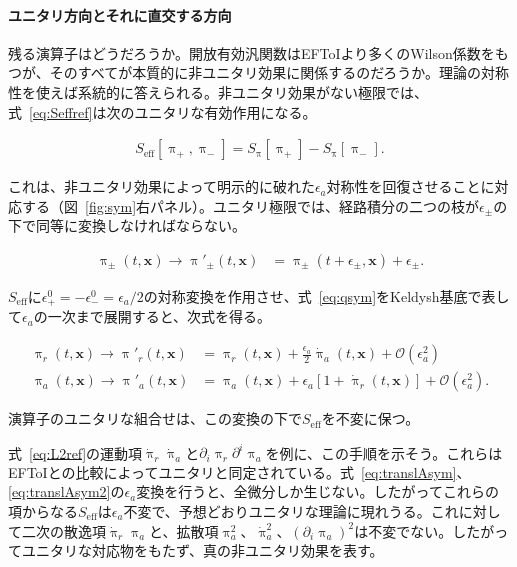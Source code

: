 \documentclass[a4paper,11pt]{ltjsarticle}
\numberwithin{equation}{section}
\newcommand{\boldmathsymbol}[1]{{\ensuremath{\boldsymbol{#1}}}}
\newcommand{\bmx}{\boldmathsymbol{x}}
\newcommand{\Eq}[1]{Eq.~(\ref{#1})}
\newcommand{\Eqs}[1]{Eqs.~(\ref{#1})}
\newcommand{\Fig}[1]{Fig.~{\ref{#1}}}
\def\bmx{{\boldsymbol{x}}}
\renewcommand{\Eq}[1]{式~\eqref{#1}}
\renewcommand{\Eqs}[1]{式~\eqref{#1}}
\renewcommand{\Fig}[1]{図~\ref{#1}}
\begin{document}
\paragraph{ユニタリ方向とそれに直交する方向}

残る演算子はどうだろうか。開放有効汎関数はEFToIより多くのWilson係数をもつが、そのすべてが本質的に非ユニタリ効果に関係するのだろうか。理論の対称性を使えば系統的に答えられる。非ユニタリ効果がない極限では、\Eq{eq:Seffref}は次のユニタリな有効作用になる。

\begin{align}\label{eq:Seffunit}
S_{\mathrm{eff}}\left[ \uppi_+, \uppi_-\right] = S_\uppi\left[\uppi_+\right] - S_\uppi\left[\uppi_-\right].
\end{align}

これは、非ユニタリ効果によって明示的に破れた$\epsilon_a$対称性を回復させることに対応する（\Fig{fig:sym}右パネル）\cite{Hongo:2018ant}。ユニタリ極限では、経路積分の二つの枝が$\epsilon_\pm$の下で同等に変換しなければならない。

\begin{align}\label{eq:qsym}
\uppi_{\pm}(t,\bmx) \rightarrow \uppi'_{\pm}(t,\bmx) &= \uppi_{\pm}(t+\epsilon_{\pm},\bmx) + \epsilon_{\pm}.
\end{align}

$S_{\mathrm{eff}}$に$\epsilon_+^0=-\epsilon_-^0=\epsilon_a/2$の対称変換を作用させ、\Eq{eq:qsym}をKeldysh基底で表して$\epsilon_a$の一次まで展開すると、次式を得る。

\begin{align}
\uppi_{r}(t,\bmx) \rightarrow \uppi'_{r}(t,\bmx) &= \uppi_{r}(t,\bmx) + \frac{\epsilon_a}{2}\dot{\uppi}_{a}(t,\bmx) + \mathcal{O}\left(\epsilon_a^2\right)\label{eq:translAsym} \\
\uppi_{a}(t,\bmx) \rightarrow \uppi'_{a}(t,\bmx) &= \uppi_{a}(t,\bmx) + \epsilon_a\left[1+\dot{\uppi}_{r}(t,\bmx)\right] + \mathcal{O}\left(\epsilon_a^2\right). \label{eq:translAsym2}
\end{align}

演算子のユニタリな組合せは、この変換の下で$S_{\mathrm{eff}}$を不変に保つ。

\Eq{eq:L2ref}の運動項$\dot{\uppi}_r\dot{\uppi}_a$と$\partial_i\uppi_r\partial^i\uppi_a$を例に、この手順を示そう。これらはEFToIとの比較によってユニタリと同定されている。\Eqs{eq:translAsym}、\eqref{eq:translAsym2}の$\epsilon_a$変換を行うと、全微分しか生じない。したがってこれらの項からなる$S_{\mathrm{eff}}$は$\epsilon_a$不変で、予想どおりユニタリな理論に現れうる。これに対して二次の散逸項$\dot{\uppi}_r\uppi_a$と、拡散項$\uppi_a^2$、$\dot{\uppi}_a^2$、$(\partial_i\uppi_a)^2$は不変でない。したがってユニタリな対応物をもたず、真の非ユニタリ効果を表す。
\end{document}

